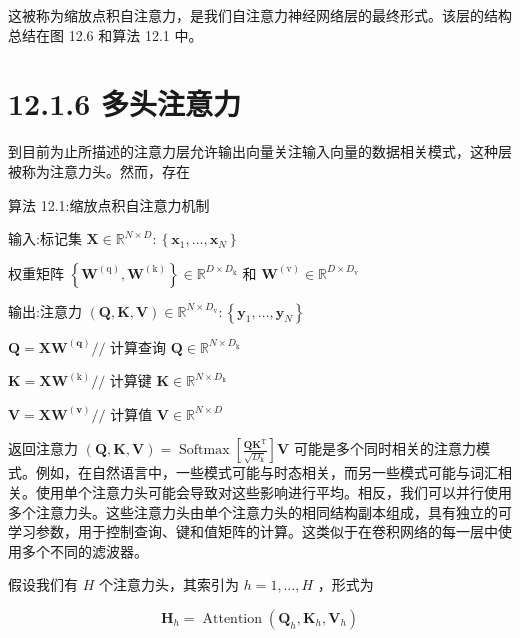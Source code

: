 \documentclass[10pt]{report}
\begin{document}
这被称为缩放点积自注意力，是我们自注意力神经网络层的最终形式。该层的结构总结在图 12.6 和算法 12.1 中。

\section*{12.1.6 多头注意力}

到目前为止所描述的注意力层允许输出向量关注输入向量的数据相关模式，这种层被称为注意力头。然而，存在

算法 12.1:缩放点积自注意力机制

输入:标记集 \(\mathbf{X} \in  {\mathbb{R}}^{N \times  D} : \left\{  {{\mathbf{x}}_{1},\ldots ,{\mathbf{x}}_{N}}\right\}\)

权重矩阵 \(\left\{  {{\mathbf{W}}^{\left( \mathrm{q}\right) },{\mathbf{W}}^{\left( \mathrm{k}\right) }}\right\}   \in  {\mathbb{R}}^{D \times  {D}_{\mathrm{k}}}\) 和 \({\mathbf{W}}^{\left( \mathrm{v}\right) } \in  {\mathbb{R}}^{D \times  {D}_{\mathrm{v}}}\)

输出:注意力 \(\left( {\mathbf{Q},\mathbf{K},\mathbf{V}}\right)  \in  {\mathbb{R}}^{N \times  {D}_{\mathrm{v}}} : \left\{  {{\mathbf{y}}_{1},\ldots ,{\mathbf{y}}_{N}}\right\}\)

\(\mathbf{Q} = \mathbf{X}{\mathbf{W}}^{\left( \mathbf{q}\right) }//\) 计算查询 \(\mathbf{Q} \in  {\mathbb{R}}^{N \times  {D}_{\mathrm{k}}}\)

\(\mathbf{K} = \mathbf{X}{\mathbf{W}}^{\left( \mathrm{k}\right) }//\) 计算键 \(\mathbf{K} \in  {\mathbb{R}}^{N \times  {D}_{\mathrm{k}}}\)

\(\mathbf{V} = \mathbf{X}{\mathbf{W}}^{\left( \mathbf{v}\right) }//\) 计算值 \(\mathbf{V} \in  {\mathbb{R}}^{N \times  D}\)

返回注意力 \(\left( {\mathbf{Q},\mathbf{K},\mathbf{V}}\right)  = \operatorname{Softmax}\left\lbrack  \frac{{\mathbf{{QK}}}^{\mathrm{T}}}{\sqrt{{D}_{\mathrm{k}}}}\right\rbrack  \mathbf{V}\) 可能是多个同时相关的注意力模式。例如，在自然语言中，一些模式可能与时态相关，而另一些模式可能与词汇相关。使用单个注意力头可能会导致对这些影响进行平均。相反，我们可以并行使用多个注意力头。这些注意力头由单个注意力头的相同结构副本组成，具有独立的可学习参数，用于控制查询、键和值矩阵的计算。这类似于在卷积网络的每一层中使用多个不同的滤波器。

假设我们有 \(H\) 个注意力头，其索引为 \(h = 1,\ldots ,H\) ，形式为

\[
{\mathbf{H}}_{h} = \operatorname{Attention}\left( {{\mathbf{Q}}_{h},{\mathbf{K}}_{h},{\mathbf{V}}_{h}}\right)  \tag{12.15}
\]
\end{document}

